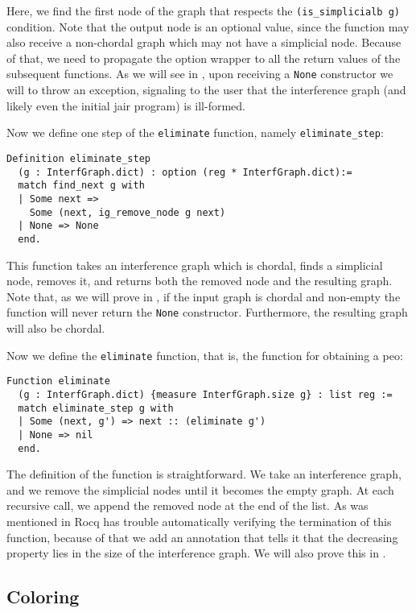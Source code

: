 Here, we find the first node of the graph that respects the \texttt{(is\_simplicialb g)} condition. Note that the output node is an optional value, since the function may also receive a non-chordal graph which may not have a simplicial node. Because of that, we need to propagate the option wrapper to all the return values of the subsequent functions.
As we will see in , upon receiving a \texttt{None} constructor we will to throw an exception, signaling to the user that the interference graph (and likely even the initial \gls{jair} program) is ill-formed.

Now we define one step of the \texttt{eliminate} function, namely \texttt{eliminate\_step}:

\begin{lstlisting}[style=Rocq]
Definition eliminate_step
  (g : InterfGraph.dict) : option (reg * InterfGraph.dict):=
  match find_next g with
  | Some next =>
    Some (next, ig_remove_node g next)
  | None => None
  end.
\end{lstlisting}

This function takes an interference graph which is chordal, finds a simplicial node, removes it, and returns both the removed node and the resulting graph.
Note that, as we will prove in , if the input graph is chordal and non-empty the function will never return the \texttt{None} constructor. Furthermore, the resulting graph will also be chordal.

Now we define the \texttt{eliminate} function, that is, the function for obtaining a \gls{peo}:

\begin{lstlisting}[style=Rocq]
Function eliminate
  (g : InterfGraph.dict) {measure InterfGraph.size g} : list reg :=
  match eliminate_step g with
  | Some (next, g') => next :: (eliminate g')
  | None => nil
  end.
\end{lstlisting}

The definition of the function is straightforward. We take an interference graph, and we remove the simplicial nodes until it becomes the empty graph. At each recursive call, we append the removed node at the end of the list.
As was mentioned in  Rocq has trouble automatically verifying the termination of this function, because of that we add an annotation that tells it that the decreasing property lies in the size of the interference graph. We will also prove this in .

\subsection{Coloring}
\label{subsec:coloring}

